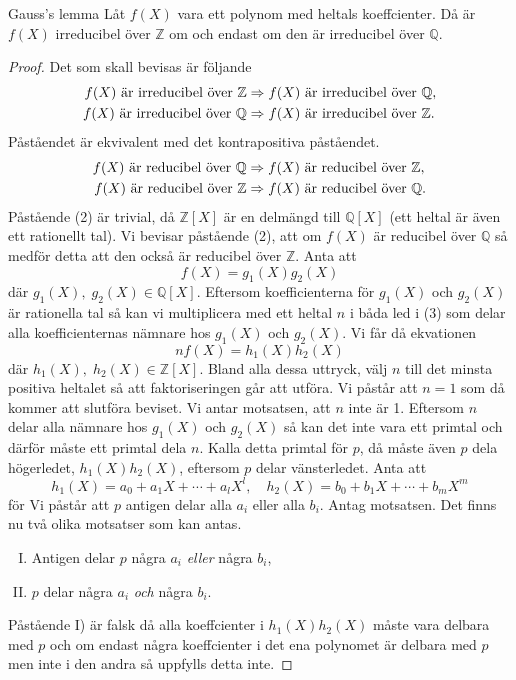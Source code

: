 \documentclass{article}
\theoremstyle{definition}
\begin{document}
\begin{mylemma}{Gauss's lemma}{}
Låt $f(X)$ vara ett polynom med heltals koeffcienter. Då är $f(X)$ irreducibel över $\mathbb{Z}$ om och endast om den är irreducibel över $\mathbb{Q}$.
\end{mylemma}
\begin{proof}
  Det som skall bevisas är följande
  \begin{align*}
    f(X) \textnormal{ är irreducibel över } \mathbb{Z} &\Rightarrow f(X) \textnormal{ är irreducibel över } \mathbb{Q}, \\
    f(X) \textnormal{ är irreducibel över } \mathbb{Q} &\Rightarrow f(X) \textnormal{ är irreducibel över } \mathbb{Z}.
  \end{align*}
  Påståendet är ekvivalent med det kontrapositiva påståendet.
  \begin{align}
    f(X) \textnormal{ är reducibel över } \mathbb{Q} &\Rightarrow f(X) \textnormal{ är reducibel över } \mathbb{Z}, \\
    f(X) \textnormal{ är reducibel över } \mathbb{Z} &\Rightarrow f(X) \textnormal{ är reducibel över } \mathbb{Q}.
  \end{align}
  Påstående (2) är trivial, då $\mathbb{Z}[X]$ är en delmängd till $\mathbb{Q}[X]$ (ett heltal är även ett rationellt tal). Vi bevisar påstående (2),
  att om $f(X)$ är reducibel över $\mathbb{Q}$ så medför detta att den också är reducibel över $\mathbb{Z}$. Anta att
  \begin{equation}
    f(X) = g_1(X)g_2(X)
  \end{equation}
  där $g_1(X), \; g_2(X) \in \mathbb{Q}[X]$. Eftersom koefficienterna för $g_1(X)$ och $g_2(X)$ är rationella tal så kan vi multiplicera med ett
  heltal $n$ i båda led i (3) som delar alla koefficienternas nämnare hos $g_1(X)$ och $g_2(X)$. Vi får då ekvationen
  \begin{equation}
    nf(X) = h_1(X)h_2(X)
  \end{equation}
  där $h_1(X), \; h_2(X) \in \mathbb{Z}[X]$. Bland alla dessa uttryck, välj $n$ till det minsta positiva heltalet
  så att faktoriseringen går att utföra. Vi påstår att $n = 1$ som då kommer att slutföra beviset. Vi antar motsatsen, att $n$ inte är 1. Eftersom 
  $n$ delar alla nämnare hos $g_1(X)$ och $g_2(X)$ så kan det inte vara ett primtal och därför måste ett primtal dela $n$. Kalla detta primtal för $p$, då 
  måste även $p$ dela högerledet, $h_1(X)h_2(X)$, eftersom $p$ delar vänsterledet. Anta att 
  \[h_1(X) = a_0 + a_1X + \cdots + a_lX^l, \quad h_2(X) = b_0 + b_1X + \cdots + b_mX^m\]
  för Vi påstår att $p$ antigen delar alla $a_i$ eller alla $b_i$. Antag motsatsen. Det finns nu två olika motsatser som kan antas.
  \begin{enumerate}[I)]
    \item Antigen delar $p$ några $a_i$ \textit{eller} några $b_i$,
    \item $p$ delar några $a_i$ \textit{och} några $b_i$.
  \end{enumerate}
  Påstående I) är falsk då alla koeffcienter i $h_1(X)h_2(X)$ måste vara delbara med $p$ och om endast några koeffcienter i det ena polynomet 
  är delbara med $p$ men inte i den andra så uppfylls detta inte. 


\end{proof}
\end{document}
